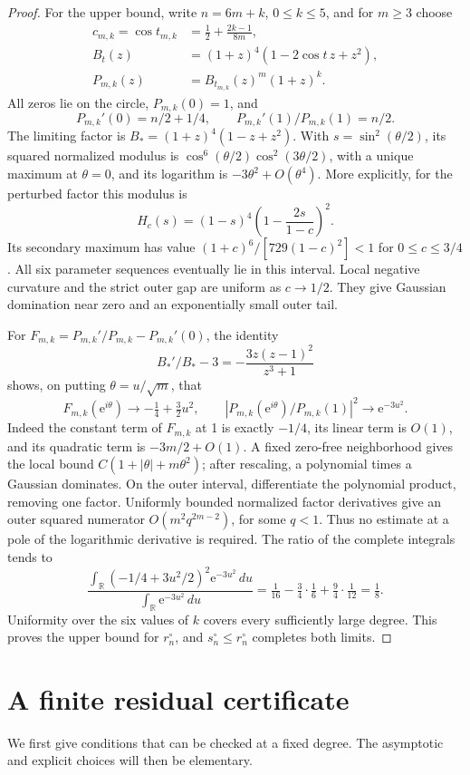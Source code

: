 \documentclass[11pt]{article}
\theoremstyle{remark}\newtheorem{remark}[theorem]{Remark}
\newcommand{\ee}{\mathrm e}
\begin{document}
\begin{proof}
For the upper bound, write \(n=6m+k\), \(0\le k\le5\), and for
\(m\ge3\) choose
\begin{align*}
 c_{m,k}=\cos t_{m,k}&=\tfrac12+\frac{2k-1}{8m},\\
 B_t(z)&=(1+z)^4(1-2\cos t\,z+z^2),\\
 P_{m,k}(z)&=B_{t_{m,k}}(z)^m(1+z)^k.
\end{align*}
All zeros lie on the circle, \(P_{m,k}(0)=1\), and
\[
 P_{m,k}'(0)=n/2+1/4,\qquad
 P_{m,k}'(1)/P_{m,k}(1)=n/2.
\]
The limiting factor is \(B_*=(1+z)^4(1-z+z^2)\).
With \(s=\sin^2(\theta/2)\), its squared normalized modulus is
\(\cos^6(\theta/2)\cos^2(3\theta/2)\), with a unique maximum at
\(\theta=0\), and its logarithm is \(-3\theta^2+O(\theta^4)\).
More explicitly, for the perturbed factor this modulus is
\[
 H_c(s)=(1-s)^4\left(1-\frac{2s}{1-c}\right)^2.
\]
Its secondary maximum has value
\((1+c)^6/[729(1-c)^2]<1\) for \(0\le c\le3/4\).
All six parameter sequences eventually lie in this interval.
Local negative curvature and the strict outer gap are uniform as
\(c\to1/2\). They give Gaussian domination near zero and an
exponentially small outer tail.

For \(F_{m,k}=P_{m,k}'/P_{m,k}-P_{m,k}'(0)\), the identity
\[
 B_*'/B_*-3=-\frac{3z(z-1)^2}{z^3+1}
\]
shows, on putting \(\theta=u/\sqrt m\), that
\[
 F_{m,k}(\ee^{i\theta})\longrightarrow-\tfrac14+\tfrac32u^2,
 \qquad
 |P_{m,k}(\ee^{i\theta})/P_{m,k}(1)|^2\longrightarrow\ee^{-3u^2}.
\]
Indeed the constant term of \(F_{m,k}\) at 1 is exactly \(-1/4\),
its linear term is \(O(1)\), and its quadratic term is
\(-3m/2+O(1)\). A fixed zero-free neighborhood gives the local bound
\(C(1+|\theta|+m\theta^2)\); after rescaling, a polynomial times
a Gaussian dominates. On the outer interval, differentiate the
polynomial product, removing one factor. Uniformly bounded normalized
factor derivatives give an outer squared numerator
\(O(m^2q^{2m-2})\), for some \(q<1\). Thus no estimate at a
pole of the logarithmic derivative is required.
The ratio of the complete integrals tends to
\[
 \frac{\int_{\mathbb R}(-1/4+3u^2/2)^2\ee^{-3u^2}\,du}
 {\int_{\mathbb R}\ee^{-3u^2}\,du}
 =\tfrac1{16}-\tfrac34\cdot\tfrac16+\tfrac94\cdot\tfrac1{12}
 =\tfrac18.
\]
Uniformity over the six values of \(k\) covers every sufficiently
large degree. This proves the upper bound for \(r_n^\circ\), and
\(s_n^\circ\le r_n^\circ\) completes both limits.
\end{proof}


\section{A finite residual certificate}
We first give conditions that can be checked at a fixed degree.
The asymptotic and explicit choices will then be elementary.
\end{document}
